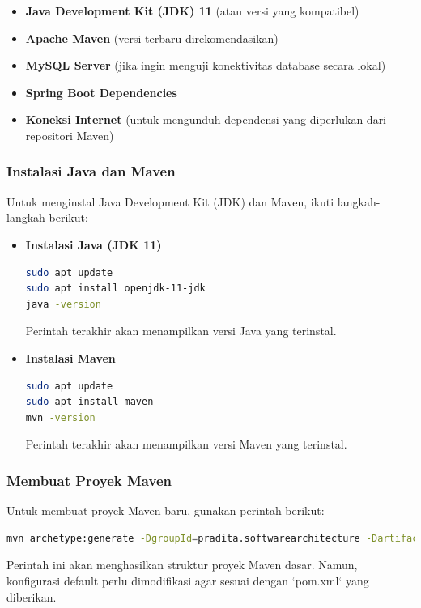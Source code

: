 \begin{itemize}
\item \textbf{Java Development Kit (JDK) 11} (atau versi yang kompatibel)
\item \textbf{Apache Maven} (versi terbaru direkomendasikan)
\item \textbf{MySQL Server} (jika ingin menguji konektivitas database secara lokal)
\item \textbf{Spring Boot Dependencies}
\item \textbf{Koneksi Internet} (untuk mengunduh dependensi yang diperlukan dari repositori Maven)
\end{itemize}

\subsubsection{Instalasi Java dan Maven}
Untuk menginstal Java Development Kit (JDK) dan Maven, ikuti langkah-langkah berikut:

\begin{itemize}
\item \textbf{Instalasi Java (JDK 11)}
\begin{lstlisting}[language=bash]
sudo apt update
sudo apt install openjdk-11-jdk
java -version
\end{lstlisting}
Perintah terakhir akan menampilkan versi Java yang terinstal.

\item \textbf{Instalasi Maven}
\begin{lstlisting}[language=bash]
sudo apt update
sudo apt install maven
mvn -version
\end{lstlisting}
Perintah terakhir akan menampilkan versi Maven yang terinstal.
\end{itemize}

\subsubsection{Membuat Proyek Maven}
Untuk membuat proyek Maven baru, gunakan perintah berikut:

\begin{lstlisting}[language=bash]
mvn archetype:generate -DgroupId=pradita.softwarearchitecture -DartifactId=currency-server -DarchetypeArtifactId=maven-archetype-quickstart -DinteractiveMode=false
\end{lstlisting}

Perintah ini akan menghasilkan struktur proyek Maven dasar. Namun, konfigurasi default perlu dimodifikasi agar sesuai dengan `pom.xml` yang diberikan.

